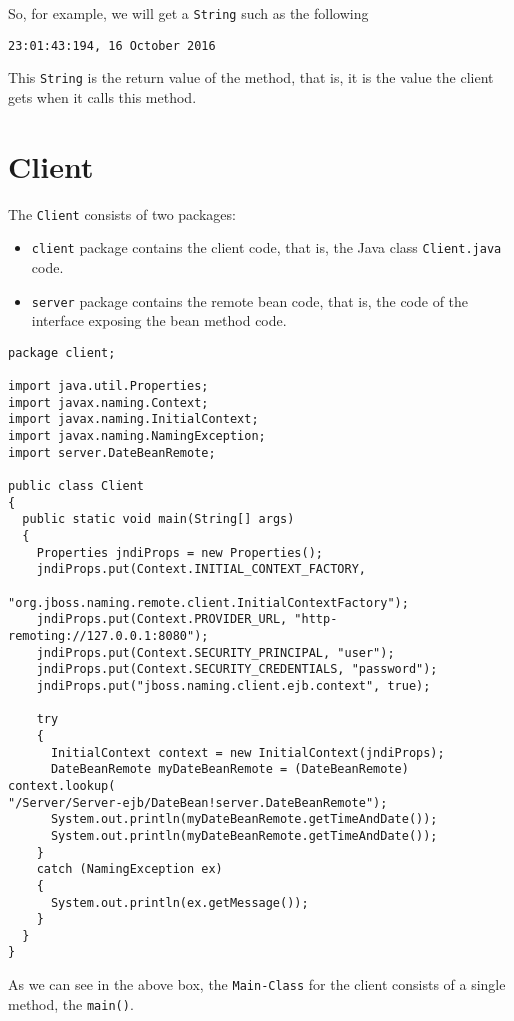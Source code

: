\documentclass{report}
\begin{document}
So, for example, we will get a \texttt{String} such as the following
\begin{center}
    \texttt{23:01:43:194, 16 October 2016}
\end{center}

This \texttt{String} is the return value of the method, that is, it is the value the client gets when it calls this method. 

\section{Client}
The \texttt{Client} consists of two packages:
\begin{itemize}
    \item \texttt{client} package contains the client code, that is, the Java class \texttt{Client.java} code.
    \item \texttt{server} package contains the remote bean code, that is, the code of the interface exposing the bean method code. 
\end{itemize}

\begin{lstlisting}
package client;

import java.util.Properties;
import javax.naming.Context;
import javax.naming.InitialContext;
import javax.naming.NamingException;
import server.DateBeanRemote;

public class Client
{
  public static void main(String[] args)
  {
    Properties jndiProps = new Properties();
    jndiProps.put(Context.INITIAL_CONTEXT_FACTORY,
                  "org.jboss.naming.remote.client.InitialContextFactory");
    jndiProps.put(Context.PROVIDER_URL, "http-remoting://127.0.0.1:8080");
    jndiProps.put(Context.SECURITY_PRINCIPAL, "user");
    jndiProps.put(Context.SECURITY_CREDENTIALS, "password");
    jndiProps.put("jboss.naming.client.ejb.context", true);

    try
    {
      InitialContext context = new InitialContext(jndiProps);
      DateBeanRemote myDateBeanRemote = (DateBeanRemote) context.lookup(
"/Server/Server-ejb/DateBean!server.DateBeanRemote");
      System.out.println(myDateBeanRemote.getTimeAndDate());
      System.out.println(myDateBeanRemote.getTimeAndDate());
    }
    catch (NamingException ex)
    {
      System.out.println(ex.getMessage());
    }
  }
}
\end{lstlisting}

As we can see in the above box, the \texttt{Main-Class} for the client consists of a single method, the \texttt{main()}.
\end{document}
